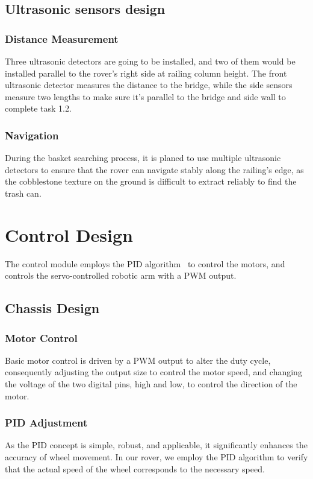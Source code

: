 \documentclass{solutionclass} %
\begin{document}
    \subsection*{Ultrasonic sensors design}
        \subsubsection{Distance Measurement}
        Three ultrasonic detectors are going to be installed, and two of them would be installed parallel to the rover’s right side at railing column height. The front ultrasonic detector measures the distance to the bridge, while the side sensors measure two lengths to make sure it's parallel to the bridge and side wall to complete task 1.2.
        
        \subsubsection{Navigation}
        During the basket searching process, it is planed to use multiple ultrasonic detectors to ensure that the rover can navigate stably along the railing's edge, as the cobblestone texture on the ground is difficult to extract reliably to find the trash can.
        
\section{Control Design}
The control module employs the PID algorithm~\cite{pid} to control the motors, and controls the servo-controlled robotic arm with a PWM output.

    \subsection*{Chassis Design}
    
        \subsubsection{Motor Control}
        Basic motor control is driven by a PWM output to alter the duty cycle, consequently adjusting the output size to control the motor speed, and changing the voltage of the two digital pins, high and low, to control the direction of the motor.
        
        \subsubsection{PID Adjustment}
        As the PID concept is simple, robust, and applicable, it significantly enhances the accuracy of wheel movement. In our rover, we employ the PID algorithm to verify that the actual speed of the wheel corresponds to the necessary speed.
        
\end{document}
